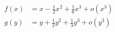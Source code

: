 \begin{align*}
  f(x) &= x -\frac{1}{2}x^2 +\frac{1}{6}x^3 +o(x^3)\\
  g(y) &= y + \frac{1}{2}y^2 + \frac{1}{3}y^3 + o(y^3)
\end{align*}
